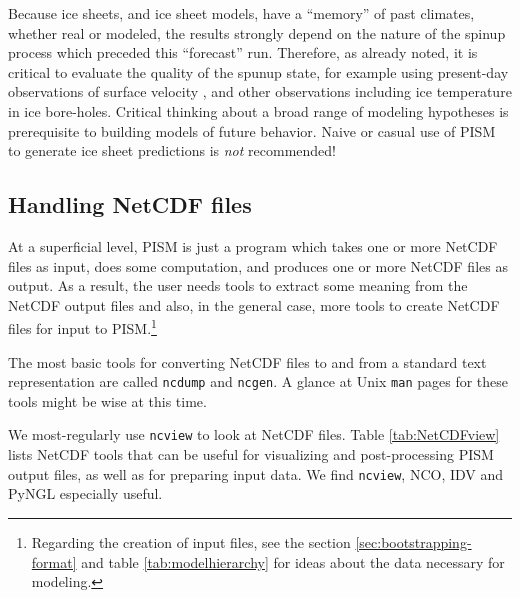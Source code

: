 Because ice sheets, and ice sheet models, have a ``memory'' of past climates, whether real or modeled, the results strongly depend on the nature of the spinup process which preceded this ``forecast'' run.  Therefore, as already noted, it is critical to evaluate the quality of the spunup state, for example using present-day observations of surface velocity \cite{BKAJS}, and other observations including ice temperature in ice bore-holes.  Critical thinking about a broad range of modeling hypotheses is prerequisite to building models of future behavior.  Naive or casual use of PISM to generate ice sheet predictions is \emph{not} recommended!


\subsection{Handling NetCDF files}\label{subsect:nctoolsintro}  At a superficial level, PISM is just a program which takes one or more NetCDF files as input, does some computation, and produces one or more NetCDF files as output.  As a result, the user needs tools to extract some meaning from the NetCDF output files and also, in the general case, more tools to create NetCDF files for input to PISM.\footnote{Regarding the creation of input files, see the section \ref{sec:bootstrapping-format} and table \ref{tab:modelhierarchy} for ideas about the data necessary for modeling.}

The most basic tools for converting NetCDF files to and from a standard text representation are called \texttt{ncdump} and \texttt{ncgen}.  A glance at Unix \texttt{man} pages for these tools might be wise at this time.

We most-regularly use \texttt{ncview} to look at NetCDF files.  Table \ref{tab:NetCDFview} lists NetCDF tools that can be useful for visualizing and post-processing PISM output files, as well as for preparing input data.  We find \texttt{ncview}, NCO, IDV and PyNGL especially useful.


